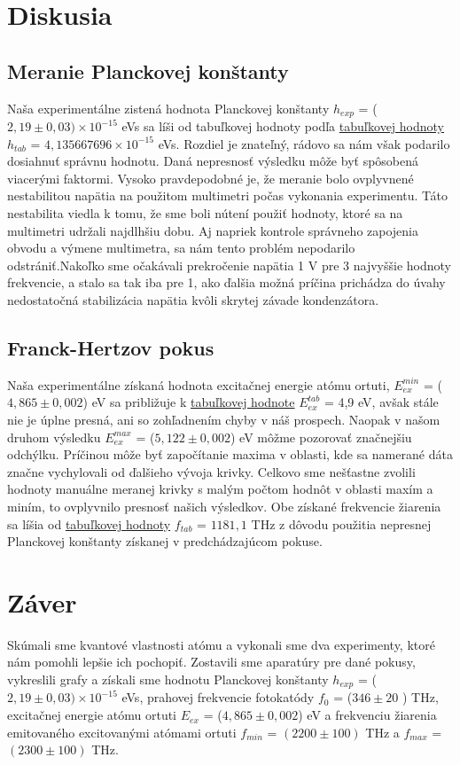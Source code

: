 \documentclass{article}
\begin{document}
\section{Diskusia}
\subsection{Meranie Planckovej konštanty}
Naša experimentálne zistená hodnota Planckovej konštanty $h_{exp}$ = ($2,19 \pm 0,03)\times 10^{-15}$ eVs sa líši od tabuľkovej hodnoty podľa \href{https://www.labo.cz/mftabulky.htm}{tabuľkovej hodnoty} $h_{tab}$ = $4,135667696 \times 10^{-15}$ eVs. Rozdiel je znateľný, rádovo sa nám však podarilo dosiahnuť správnu hodnotu. Daná nepresnosť výsledku môže byť spôsobená viacerými faktormi. Vysoko pravdepodobné je, že meranie bolo ovplyvnené nestabilitou napätia na použitom multimetri počas vykonania experimentu. Táto nestabilita viedla k tomu, že sme boli nútení použiť hodnoty, ktoré sa na multimetri udržali najdlhšiu dobu. Aj napriek kontrole správneho zapojenia obvodu a výmene multimetra, sa nám tento problém nepodarilo odstrániť.Nakoľko sme očakávali prekročenie napätia 1 V pre 3 najvyššie hodnoty frekvencie, a stalo sa tak iba pre 1, ako ďalšia možná príčina prichádza do úvahy nedostatočná stabilizácia napätia kvôli skrytej závade kondenzátora.
\subsection{Franck-Hertzov pokus}
Naša experimentálne získaná hodnota excitačnej energie atómu ortuti, $E_{ex}^{min}$ = ($4,865 \pm 0,002 $) eV sa približuje k \href{https://www.labo.cz/mftabulky.htm}{tabuľkovej hodnote} $E_{ex}^{tab}$ = 4,9 eV, avšak stále  nie je úplne presná, ani so zohľadnením chyby v náš prospech. Naopak v našom druhom výsledku  $E_{ex}^{max}$ = ($5,122 \pm 0,002 $) eV môžme pozorovať značnejšiu odchýlku. Príčinou môže byť započítanie maxima v oblasti, kde sa namerané dáta značne vychylovali od ďalšieho vývoja krivky. Celkovo sme nešťastne zvolili hodnoty manuálne meranej krivky s malým počtom hodnôt v oblasti maxím a miním, to ovplyvnilo presnosť našich výsledkov. Obe získané frekvencie žiarenia sa líšia od \href{https://www.labo.cz/mftabulky.htm}{tabuľkovej hodnoty} $f_{tab}$ = $1181,1$ THz z dôvodu použitia nepresnej Planckovej konštanty získanej v predchádzajúcom pokuse. 
\section{Záver}
Skúmali sme kvantové vlastnosti atómu a vykonali sme dva experimenty, ktoré nám pomohli lepšie ich pochopiť. Zostavili sme aparatúry pre dané pokusy, vykreslili grafy a získali sme hodnotu Planckovej konštanty  $h_{exp}$ = ($2,19 \pm 0,03)\times 10^{-15}$ eVs, prahovej frekvencie fotokatódy $f_0$ = ($346 \pm 20$ ) THz, excitačnej energie atómu ortuti $E_{ex}$ = ($4,865 \pm 0,002 $) eV a frekvenciu žiarenia emitovaného excitovanými atómami ortuti $f_{min}$ = $(2200 \pm 100)$ THz a $f_{max}$ = $(2300 \pm 100)$ THz.  
\end{document}
